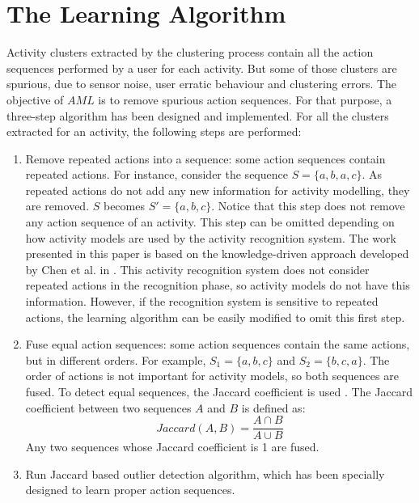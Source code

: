 \section{The Learning Algorithm}
\label{sec:learner:algorithm}

Activity clusters extracted by the clustering process contain all the action sequences performed by a user for each activity. But some of those clusters are spurious, due to sensor noise, user erratic behaviour and clustering errors. The objective of $AML$ is to remove spurious action sequences. For that purpose, a three-step algorithm has been designed and implemented. For all the clusters extracted for an activity, the following steps are performed:

\begin{enumerate}
 \item Remove repeated actions into a sequence: some action sequences contain repeated actions. For instance, consider the sequence $S=\{a, b, a, c\}$. As repeated actions do not add any new information for activity modelling, they are removed. $S$ becomes $S' = \{a, b, c\}$. Notice that this step does not remove any action sequence of an activity. This step can be omitted depending on how activity models are used by the activity recognition system. The work presented in this paper is based on the knowledge-driven approach developed by Chen et al. in \cite{Chen2012a}. This activity recognition system does not consider repeated actions in the recognition phase, so activity models do not have this information. However, if the recognition system is sensitive to repeated actions, the learning algorithm can be easily modified to omit this first step.
 \item Fuse equal action sequences: some action sequences contain the same actions, but in different orders. For example, $S_1 = \{a, b, c \}$ and $S_2 = \{b, c, a\}$. The order of actions is not important for activity models, so both sequences are fused. To detect equal sequences, the Jaccard coefficient is used \cite{A.K.Jain1988}. The Jaccard coefficient between two sequences $A$ and $B$ is defined as:
 \begin{equation}
  Jaccard(A, B) = \frac{A \cap B}{A \cup B}
 \end{equation}
Any two sequences whose Jaccard coefficient is 1 are fused. 
 \item Run Jaccard based outlier detection algorithm, which has been specially designed to learn proper action sequences.
\end{enumerate}

